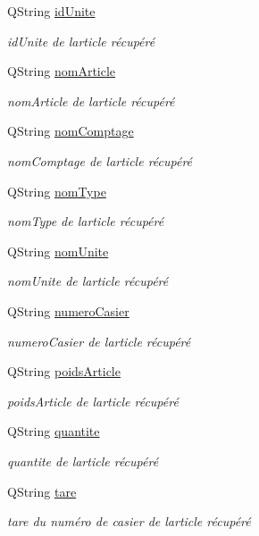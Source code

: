 \begin{DoxyCompactItemize}
Q\+String \hyperlink{class_article_a702cff16cb9cd0774383ceba81d83869}{id\+Unite}
\begin{DoxyCompactList}\small\item\em id\+Unite de l\textquotesingle{}article récupéré \end{DoxyCompactList}\item 
Q\+String \hyperlink{class_article_a0ba6c08f7dd54e4b7caf673ecd6b41a6}{nom\+Article}
\begin{DoxyCompactList}\small\item\em nom\+Article de l\textquotesingle{}article récupéré \end{DoxyCompactList}\item 
Q\+String \hyperlink{class_article_a1953a03d4505797952054141dbb2e327}{nom\+Comptage}
\begin{DoxyCompactList}\small\item\em nom\+Comptage de l\textquotesingle{}article récupéré \end{DoxyCompactList}\item 
Q\+String \hyperlink{class_article_a06489a7445495277e44c7179b7cf8bbc}{nom\+Type}
\begin{DoxyCompactList}\small\item\em nom\+Type de l\textquotesingle{}article récupéré \end{DoxyCompactList}\item 
Q\+String \hyperlink{class_article_a43a20e248e57150af0546c9f4b6b74c3}{nom\+Unite}
\begin{DoxyCompactList}\small\item\em nom\+Unite de l\textquotesingle{}article récupéré \end{DoxyCompactList}\item 
Q\+String \hyperlink{class_article_a4b8dd9598cc16200c60c7f55196fc26d}{numero\+Casier}
\begin{DoxyCompactList}\small\item\em numero\+Casier de l\textquotesingle{}article récupéré \end{DoxyCompactList}\item 
Q\+String \hyperlink{class_article_ac42217ed32ef1466b099f3e4a6a913f0}{poids\+Article}
\begin{DoxyCompactList}\small\item\em poids\+Article de l\textquotesingle{}article récupéré \end{DoxyCompactList}\item 
Q\+String \hyperlink{class_article_a0870104453080b43bc271346217a864b}{quantite}
\begin{DoxyCompactList}\small\item\em quantite de l\textquotesingle{}article récupéré \end{DoxyCompactList}\item 
Q\+String \hyperlink{class_article_abacf2d29d4b2e3e7b49256bc48d5fe64}{tare}
\begin{DoxyCompactList}\small\item\em tare du numéro de casier de l\textquotesingle{}article récupéré \end{DoxyCompactList}\end{DoxyCompactItemize}
